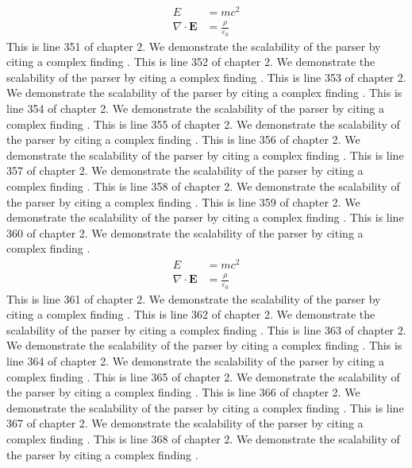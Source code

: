 \begin{align*}
  E &= mc^2 \\
  \nabla \cdot \mathbf{E} &= \frac{\rho}{\varepsilon_0}
\end{align*}
This is line 351 of chapter 2. We demonstrate the scalability of the parser by citing a complex finding \cite{ref2_351}.
This is line 352 of chapter 2. We demonstrate the scalability of the parser by citing a complex finding \cite{ref2_352}.
This is line 353 of chapter 2. We demonstrate the scalability of the parser by citing a complex finding \cite{ref2_353}.
This is line 354 of chapter 2. We demonstrate the scalability of the parser by citing a complex finding \cite{ref2_354}.
This is line 355 of chapter 2. We demonstrate the scalability of the parser by citing a complex finding \cite{ref2_355}.
This is line 356 of chapter 2. We demonstrate the scalability of the parser by citing a complex finding \cite{ref2_356}.
This is line 357 of chapter 2. We demonstrate the scalability of the parser by citing a complex finding \cite{ref2_357}.
This is line 358 of chapter 2. We demonstrate the scalability of the parser by citing a complex finding \cite{ref2_358}.
This is line 359 of chapter 2. We demonstrate the scalability of the parser by citing a complex finding \cite{ref2_359}.
This is line 360 of chapter 2. We demonstrate the scalability of the parser by citing a complex finding \cite{ref2_360}.
\begin{align*}
  E &= mc^2 \\
  \nabla \cdot \mathbf{E} &= \frac{\rho}{\varepsilon_0}
\end{align*}
This is line 361 of chapter 2. We demonstrate the scalability of the parser by citing a complex finding \cite{ref2_361}.
This is line 362 of chapter 2. We demonstrate the scalability of the parser by citing a complex finding \cite{ref2_362}.
This is line 363 of chapter 2. We demonstrate the scalability of the parser by citing a complex finding \cite{ref2_363}.
This is line 364 of chapter 2. We demonstrate the scalability of the parser by citing a complex finding \cite{ref2_364}.
This is line 365 of chapter 2. We demonstrate the scalability of the parser by citing a complex finding \cite{ref2_365}.
This is line 366 of chapter 2. We demonstrate the scalability of the parser by citing a complex finding \cite{ref2_366}.
This is line 367 of chapter 2. We demonstrate the scalability of the parser by citing a complex finding \cite{ref2_367}.
This is line 368 of chapter 2. We demonstrate the scalability of the parser by citing a complex finding \cite{ref2_368}.
